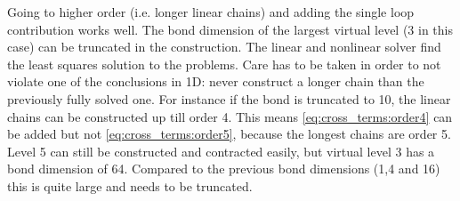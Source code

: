 Going to higher order (i.e. longer linear chains) and adding the single loop contribution works well. The bond dimension of the largest virtual level (3 in this case) can be truncated in the construction. The linear and nonlinear solver find the least squares solution to the problems. Care has to be taken in order to not violate one of the conclusions in 1D: never construct a longer chain than the previously fully solved one. For instance if the bond is truncated to 10, the linear chains can be constructed up till order 4. This means \cref{eq:cross_terms:order4} can be added but not \cref{eq:cross_terms:order5}, because the longest chains are order 5. Level 5 can still be constructed and contracted easily, but virtual level 3 has a bond dimension of 64. Compared to the previous bond dimensions (1,4 and 16) this is quite large and needs to be truncated.

